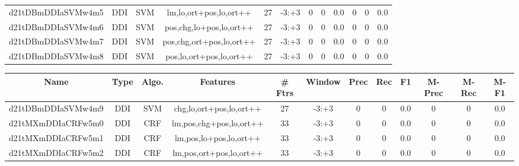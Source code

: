 \documentclass[a4paper]{article}
\begin{document}
\begin{landscape}
\begin{center}
\begin{tabular}{ |c|c|c|c|c|c|c|c|c|c|c|c|}
 
 	
 	\small{ d21tDBmDDIaSVMw4m5 } & \small{ DDI} & \small{  SVM }  & lm,lo,ort+pos,lo,ort++  &  27 &  \small{  -3:+3 }  &  0 & 0 & 0.0  &  0 & 0 & 0.0 \\
 	

 
 	
 	\small{ d21tDBmDDIaSVMw4m6 } & \small{ DDI} & \small{  SVM }  & pos,chg,lo+pos,lo,ort++  &  27 &  \small{  -3:+3 }  &  0 & 0 & 0.0  &  0 & 0 & 0.0 \\
 	

 
 	
 	\small{ d21tDBmDDIaSVMw4m7 } & \small{ DDI} & \small{  SVM }  & pos,chg,ort+pos,lo,ort++  &  27 &  \small{  -3:+3 }  &  0 & 0 & 0.0  &  0 & 0 & 0.0 \\
 	

 
 	
 	\small{ d21tDBmDDIaSVMw4m8 } & \small{ DDI} & \small{  SVM }  & pos,lo,ort+pos,lo,ort++  &  27 &  \small{  -3:+3 }  &  0 & 0 & 0.0  &  0 & 0 & 0.0 \\
 	
 \hline
\end{tabular}
\end{center}




\begin{center}
\begin{tabular}{ |c|c|c|c|c|c|c|c|c|c|c|c|} 
 \hline
 	Name & Type & Algo. & Features & \# Ftrs & Window & Prec & Rec & F1 & M-Prec & M-Rec & M-F1\\
 \hline

 	

 
 	
 	\small{ d21tDBmDDIaSVMw4m9 } & \small{ DDI} & \small{  SVM }  & chg,lo,ort+pos,lo,ort++  &  27 &  \small{  -3:+3 }  &  0 & 0 & 0.0  &  0 & 0 & 0.0 \\
 	

 
 	
 	\small{ d21tMXmDDIaCRFw5m0 } & \small{ DDI} & \small{  CRF }  & lm,pos,chg+pos,lo,ort++  &  33 &  \small{  -3:+3 }  &  0 & 0 & 0.0  &  0 & 0 & 0.0 \\
 	

 
 	
 	\small{ d21tMXmDDIaCRFw5m1 } & \small{ DDI} & \small{  CRF }  & lm,pos,lo+pos,lo,ort++  &  33 &  \small{  -3:+3 }  &  0 & 0 & 0.0  &  0 & 0 & 0.0 \\
 	

 
 	
 	\small{ d21tMXmDDIaCRFw5m2 } & \small{ DDI} & \small{  CRF }  & lm,pos,ort+pos,lo,ort++  &  33 &  \small{  -3:+3 }  &  0 & 0 & 0.0  &  0 & 0 & 0.0 \\
 	


\end{tabular}
\end{center}
\end{landscape}
\end{document}
